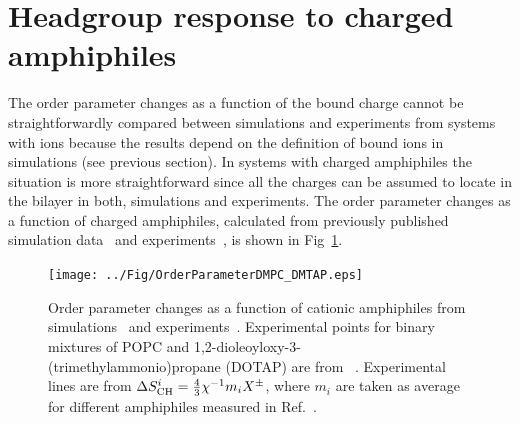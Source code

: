 \documentclass[twoside,twocolumn,9pt]{article}
\begin{document}




\section{Headgroup response to charged amphiphiles}

The order parameter changes as a function of the bound charge cannot be straightforwardly
compared between simulations and experiments from systems with ions because the 
results depend on the definition of bound ions in simulations (see previous section). In systems with charged
amphiphiles the situation is more straightforward since all the charges can be assumed 
to locate in the bilayer in both, simulations and experiments. The order parameter changes as a 
function of charged amphiphiles, calculated from previously published simulation 
data~\cite{miettinen09,DMPC_DMTAP0mol,DMPC_DMTAP6mol,DMPC_DMTAP50mol} and
experiments~\cite{scherer89,franzin98}, is shown in Fig~\ref{DMPC_DMTAP}.
\begin{figure}[t]
  \centering
  \texttt{[image: ../Fig/OrderParameterDMPC\_DMTAP.eps]} 
  \caption{\label{DMPC_DMTAP}
    Order parameter changes as a function of cationic amphiphiles from simulations~\cite{miettinen09,DMPC_DMTAP0mol,DMPC_DMTAP6mol,DMPC_DMTAP50mol} 
    and experiments~\cite{scherer89,franzin98}. Experimental points for binary mixtures of POPC and 1,2-dioleoyloxy-3-(trimethylammonio)propane (DOTAP)
    are from ~\cite{franzin98}. Experimental lines are from $\Delta S_{\rm{CH}}^{i}=\frac{4}{3}\chi^{-1}m_i X^\pm$, where $m_i$ are taken as average
    for different amphiphiles measured in Ref.~.
}
\end{figure}
\end{document}
